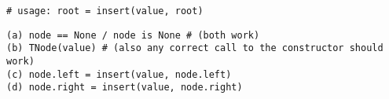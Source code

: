 \begin{parts}
\begin{lstlisting}[mathescape=true]
# usage: root = insert(value, root)
\end{lstlisting}

\begin{subparts}

\subpart[1]
\begin{tcolorbox}[fit,height=1cm, width=12cm, blank, borderline={1pt}{-2pt}]
\end{tcolorbox}

\subpart[1]
\begin{tcolorbox}[fit,height=1cm, width=12cm, blank, borderline={1pt}{-2pt}]
\end{tcolorbox}

\subpart[1]
\begin{tcolorbox}[fit,height=1cm, width=12cm, blank, borderline={1pt}{-2pt}]
\end{tcolorbox}

\subpart[1]
\begin{tcolorbox}[fit,height=1cm, width=12cm, blank, borderline={1pt}{-2pt}]
\end{tcolorbox}


\end{subparts}

\begin{soln}
\begin{lstlisting}
(a) node == None / node is None # (both work)
(b) TNode(value) # (also any correct call to the constructor should work)
(c) node.left = insert(value, node.left)
(d) node.right = insert(value, node.right)    
\end{lstlisting}
\end{soln}

\end{parts}
